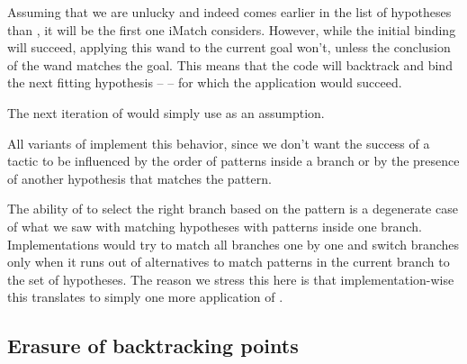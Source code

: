 Assuming that we are unlucky and  indeed comes earlier in the list of hypotheses than , it will be the first one iMatch considers.
However, while the initial binding will succeed, applying this wand to the current goal won't, unless the conclusion of the wand matches the goal.
This means that the code will backtrack and bind the next fitting hypothesis --  -- for which the application would succeed.

The next iteration of  would simply use  as an assumption.

All variants of  implement this behavior, since we don't want the success of a tactic to be influenced by the order of patterns inside a branch or by the presence of another hypothesis that matches the pattern.

The ability of  to select the right branch based on the pattern is a degenerate case of what we saw with matching hypotheses with patterns inside one branch.
Implementations would try to match all branches one by one and switch branches only when it runs out of alternatives to match patterns in the current branch to the set of hypotheses.
The reason we stress this here is that implementation-wise this translates to simply one more application of .

\subsection{Erasure of backtracking points}

